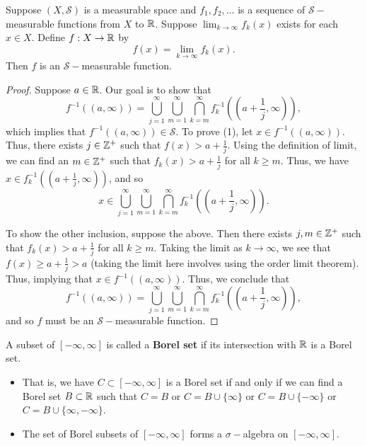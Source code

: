 \documentclass[11pt,a4paper]{book}
\begin{document}
\begin{prop}
   Suppose \( (X, \mathcal{S}) \) is a measurable space and \( {f}_{1}, {f}_{2}, \dots  \) is a sequence of \( \mathcal{S}- \)measurable functions from \( X  \) to \( \mathbb{R}  \). Suppose \( \lim_{ k  \to \infty  }  {f}_{k } (x)  \) exists for each \( x \in X  \). Define \( f: X \to \mathbb{R}  \) by
   \[  f(x) = \lim_{ k  \to  \infty   }  {f}_{k } (x). \]
   Then \( f \) is an \( \mathcal{S}- \)measurable function.
\end{prop}
\begin{proof}
Suppose \( a \in \mathbb{R}  \). Our goal is to show that 
\[  f^{-1}((a,\infty )) = \bigcup_{ j=1  }^{ \infty  }  \bigcup_{ m = 1  }^{ \infty  }  \bigcap_{  k= m  }^{ \infty  } {f}_{k }^{-1} ((a + \frac{ 1 }{ j }, \infty  )), \tag{1}   \]
which implies that \( f^{-1}((a,\infty )) \in \mathcal{S} \). To prove (1), let \( x \in f^{-1}((a,\infty )) \). Thus, there exists \( j \in \mathbb{Z}^{+} \) such that \( f(x) > a + \frac{ 1 }{ j }  \). Using the definition of limit, we can find an \( m \in \mathbb{Z}^{+} \) such that \( {f}_{k }(x) > a + \frac{ 1 }{ j }  \) for all \( k \geq m  \). Thus, we have \( x \in {f}_{k }^{-1}((a + \frac{ 1 }{ j }, \infty  )) \), and so 
\[  x \in  \bigcup_{ j=1  }^{ \infty  }  \bigcup_{ m = 1  }^{ \infty  }  \bigcap_{  k= m  }^{ \infty  } {f}_{k }^{-1} ((a + \frac{ 1 }{ j }, \infty  )).\]

To show the other inclusion, suppose the above. Then there exists \( j,m \in \mathbb{Z}^{+} \) such that \( {f}_{k }(x) > a + \frac{ 1 }{ j }  \) for all \( k \geq m  \). Taking the limit as \( k \to  \infty  \), we see that \( f(x) \geq a  + \frac{ 1 }{ j } > a  \) (taking the limit here involves using the order limit theorem).  Thus, implying that \( x \in f^{-1}((a,\infty )) \). Thus, we conclude that
\[  f^{-1}((a,\infty )) = \bigcup_{ j=1  }^{ \infty  }  \bigcup_{ m = 1  }^{ \infty  }  \bigcap_{  k= m  }^{ \infty  } {f}_{k }^{-1} ((a + \frac{ 1 }{ j }, \infty  )),   \]
and so \( f  \) must be an \( \mathcal{S}- \)measurable function.
\end{proof}

\begin{definition}
    A subset of \( [- \infty, \infty] \) is called a \textbf{Borel set} if its intersection with \( \mathbb{R}  \) is a Borel set.
\end{definition}

\begin{itemize}
    \item That is, we have \( C \subset [-\infty , \infty ] \) is a Borel set if and only if we can find a Borel set \( B \subset \mathbb{R}  \) such that \( C = B  \) or \( C = B \cup \{ \infty  \}   \) or \( C = B \cup \{ -\infty  \}   \) or \( C = B \cup \{ \infty , -\infty  \}  \).
    \item The set of Borel subsets of \( [-\infty , \infty ] \) forms a \( \sigma- \)algebra on \( [-\infty , \infty ] \).
\end{itemize}
\end{document}
